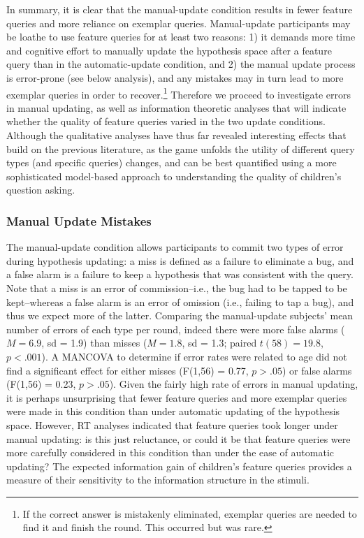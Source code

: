 \documentclass[man,floatsintext]{apa6}
\begin{document}
 In summary, it is clear that the manual-update condition results in fewer feature 
queries and more reliance on exemplar queries. 
Manual-update participants may be loathe to use feature queries for at least two reasons: 1) it demands more time and cognitive effort to manually update the hypothesis space after a feature query than 
in the automatic-update condition, and 2) the manual update process is error-prone (see below analysis), 
and any mistakes may in turn lead to more exemplar queries in order to recover.\footnote{If the correct answer is mistakenly eliminated, exemplar queries are needed to find it and finish the round. This occurred but was rare.} Therefore we proceed to investigate errors in manual updating, as well as information theoretic analyses that will indicate whether the quality of feature queries varied in the two update conditions. Although the qualitative analyses have thus far revealed interesting effects that build on the previous literature, as the game unfolds the utility of different query types (and specific queries) changes, and can be best quantified using a more sophisticated model-based approach to understanding the quality of children's question asking.

\subsubsection{Manual Update Mistakes}

The manual-update condition allows participants to commit two types of error during 
hypothesis updating: a miss is defined as a failure to eliminate a bug, and a false 
alarm is a failure to keep a hypothesis that was consistent with the query. Note that 
a miss is an error of commission--i.e., the bug had to be tapped to be kept--whereas 
a false alarm is an error of omission (i.e., failing to tap a bug), and thus we expect 
more of the latter. Comparing the manual-update subjects' mean number of errors of 
each type per round, indeed there were more false alarms ($M=6.9$, sd = 1.9) than 
misses ($M=1.8$, sd = 1.3; paired $t(58) = 19.8$, $p<.001$). A MANCOVA to 
determine if error rates were related to age did not find a significant effect for either 
misses (F(1,56) = 0.77, $p>.05$) or false alarms (F(1,56) = 0.23, $p>.05$). Given 
the fairly high rate of errors in manual updating, it is perhaps unsurprising that fewer 
feature queries and more exemplar queries were made in this condition than under 
automatic updating of the hypothesis space. However, RT analyses indicated that 
feature queries took longer under manual updating: is this just reluctance, or could it 
be that feature queries were more carefully considered in this condition than under 
the ease of automatic updating? The expected information gain of children's feature queries provides a measure of their sensitivity to the information structure in the stimuli.
\end{document}
